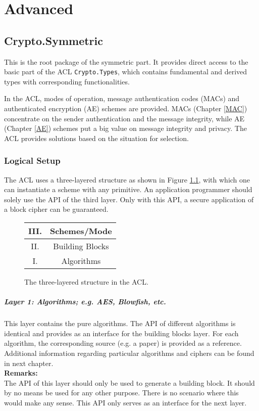 \part{Advanced}
\chapter{Crypto.Symmetric}
This is the root package of the symmetric part. It provides direct access to the basic part of the ACL \texttt{Crypto.Types}, which contains fundamental and derived types with corresponding functionalities.

In the ACL, modes of operation, message authentication codes (MACs) and authenticated encryption (AE) schemes are provided. MACs (Chapter \ref{MAC}) concentrate on the sender authentication and the message integrity, while AE (Chapter \ref{AE}) schemes put a big value on message integrity and privacy.
The ACL provides solutions based on the situation for selection.

\section*{Logical Setup}
The ACL uses a three-layered structure as shown in Figure \ref{scheme}, with which one can instantiate a scheme with any primitive. An application programmer should solely use the API of the third layer. Only with this API, a secure application of a block cipher can be guaranteed.
\begin{figure}
  \begin{center}
    \huge
    \begin{tabular}{|c @{\ } c|}\hline
      III. &Schemes/Mode\\
      \hline
      II. & Building Blocks\\
      \hline
      I. & Algorithms\\
    \hline
    \end{tabular}
  \end{center}
\caption{The three-layered structure in the ACL.}\label{scheme}
\end{figure}
\subsubsection{Layer 1: Algorithms; e.g. AES, Blowfish, etc.}
This layer contains the pure algorithms. The API of different algorithms is identical and provides as an interface for the building blocks layer.
For each algorithm, the corresponding source (e.g. a paper) is provided as a reference. 
Additional information regarding particular algorithms and ciphers can be found in next chapter. \\ 
\textbf{Remarks:}\\
The API of this layer should only be used to generate a building block.
It should by no means be used for any other purpose. There is no scenario where this would make any sense. This API only serves as an interface for the next layer.

